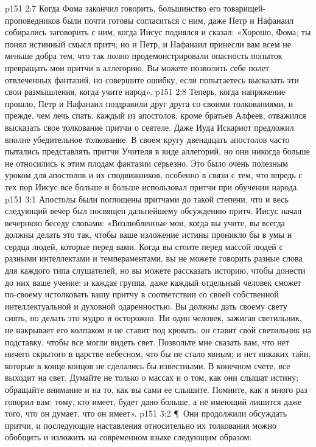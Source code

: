 \vs p151 2:7 Когда Фома закончил говорить, большинство его товарищей\hyp{}проповедников были почти готовы согласиться с ним, даже Петр и Нафанаил собирались заговорить с ним, когда Иисус поднялся и сказал: «Хорошо, Фома; ты понял истинный смысл притч; но и Петр, и Нафанаил принесли вам всем не меньше добра тем, что так полно продемонстрировали опасность попыток превращать мои притчи в аллегорию. Вы можете позволить себе полет отвлеченных фантазий, но совершите ошибку, если попытаетесь высказать эти свои размышления, когда учите народ».
\vs p151 2:8 Теперь, когда напряжение прошло, Петр и Нафанаил поздравили друг друга со своими толкованиями, и прежде, чем лечь спать, каждый из апостолов, кроме братьев Алфеев, отважился высказать свое толкование притчи о сеятеле. Даже Иуда Искариот предложил вполне убедительное толкование. В своем кругу двенадцать апостолов часто пытались представлять притчи Учителя в виде аллегорий, но они никогда больше не относились к этим плодам фантазии серьезно. Это было очень полезным уроком для апостолов и их сподвижников, особенно в связи с тем, что впредь с тех пор Иисус все больше и больше использовал притчи при обучении народа.
\vs p151 3:1 Апостолы были поглощены притчами до такой степени, что и весь следующий вечер был посвящен дальнейшему обсуждению притч. Иисус начал вечернюю беседу словами: «Возлюбленные мои, когда вы учите, вы всегда должны делать это так, чтобы ваше изложение истины проникло бы в умы и сердца людей, которые перед вами. Когда вы стоите перед массой людей с разными интеллектами и темпераментами, вы не можете говорить разные слова для каждого типа слушателей, но вы можете рассказать историю, чтобы донести до них ваше учение; и каждая группа, даже каждый отдельный человек сможет по\hyp{}своему истолковать вашу притчу в соответствии со своей собственной интеллектуальной и духовной одаренностью. Вы должны дать своему свету сиять, но делать это мудро и осторожно. Ни один человек, зажигая светильник, не накрывает его колпаком и не ставит под кровать; он ставит свой светильник на подставку, чтобы все могли видеть свет. Позвольте мне сказать вам, что нет ничего скрытого в царстве небесном, что бы не стало явным; и нет никаких тайн, которые в конце концов не сделались бы известными. В конечном счете, все выходит на свет. Думайте не только о массах и о том, как они слышат истину; обращайте внимание и на то, как вы сами ее слышите. Помните, как я много раз говорил вам: тому, кто имеет, будет дано больше, а не имеющий лишится даже того, что он думает, что он имеет».
\vs p151 3:2 \P\ Они продолжили обсуждать притчи, и последующие наставления относительно их толкования можно обобщить и изложить на современном языке следующим образом:
